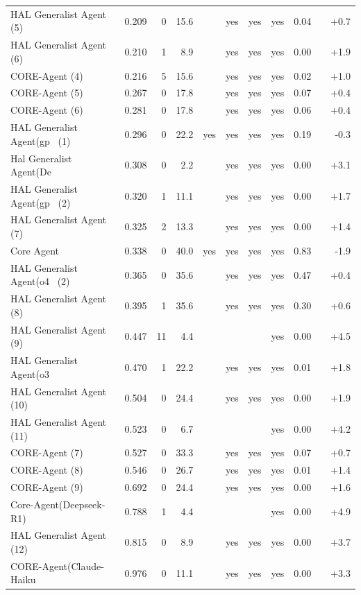 {\begin{longtable}{lrrrcccccrr}
HAL Generalist Agent (5) & 0.209 & 0 & 15.6 &  & yes & yes & yes & 0.04 &  & +0.7 \\
HAL Generalist Agent (6) & 0.210 & 1 & 8.9 &  & yes & yes & yes & 0.00 &  & +1.9 \\
CORE-Agent (4) & 0.216 & 5 & 15.6 &  & yes & yes & yes & 0.02 &  & +1.0 \\
CORE-Agent (5) & 0.267 & 0 & 17.8 &  & yes & yes & yes & 0.07 &  & +0.4 \\
CORE-Agent (6) & 0.281 & 0 & 17.8 &  & yes & yes & yes & 0.06 &  & +0.4 \\
HAL Generalist Agent(gp~ (1) & 0.296 & 0 & 22.2 & yes & yes & yes & yes & 0.19 &  & -0.3 \\
Hal Generalist Agent(De~ & 0.308 & 0 & 2.2 &  & yes & yes & yes & 0.00 &  & +3.1 \\
HAL Generalist Agent(gp~ (2) & 0.320 & 1 & 11.1 &  & yes & yes & yes & 0.00 &  & +1.7 \\
HAL Generalist Agent (7) & 0.325 & 2 & 13.3 &  & yes & yes & yes & 0.00 &  & +1.4 \\
Core Agent & 0.338 & 0 & 40.0 & yes & yes & yes & yes & 0.83 &  & -1.9 \\
HAL Generalist Agent(o4~ (2) & 0.365 & 0 & 35.6 &  & yes & yes & yes & 0.47 &  & +0.4 \\
HAL Generalist Agent (8) & 0.395 & 1 & 35.6 &  & yes & yes & yes & 0.30 &  & +0.6 \\
HAL Generalist Agent (9) & 0.447 & 11 & 4.4 &  &  &  & yes & 0.00 &  & +4.5 \\
HAL Generalist Agent(o3~ & 0.470 & 1 & 22.2 &  & yes & yes & yes & 0.01 &  & +1.8 \\
HAL Generalist Agent (10) & 0.504 & 0 & 24.4 &  & yes & yes & yes & 0.00 &  & +1.9 \\
HAL Generalist Agent (11) & 0.523 & 0 & 6.7 &  &  &  & yes & 0.00 &  & +4.2 \\
CORE-Agent (7) & 0.527 & 0 & 33.3 &  & yes & yes & yes & 0.07 &  & +0.7 \\
CORE-Agent (8) & 0.546 & 0 & 26.7 &  & yes & yes & yes & 0.01 &  & +1.4 \\
CORE-Agent (9) & 0.692 & 0 & 24.4 &  & yes & yes & yes & 0.00 &  & +1.6 \\
Core-Agent(Deepseek-R1) & 0.788 & 1 & 4.4 &  &  &  & yes & 0.00 &  & +4.9 \\
HAL Generalist Agent (12) & 0.815 & 0 & 8.9 &  & yes & yes & yes & 0.00 &  & +3.7 \\
CORE-Agent(Claude-Haiku~ & 0.976 & 0 & 11.1 &  & yes & yes & yes & 0.00 &  & +3.3 \\

\end{longtable}}
